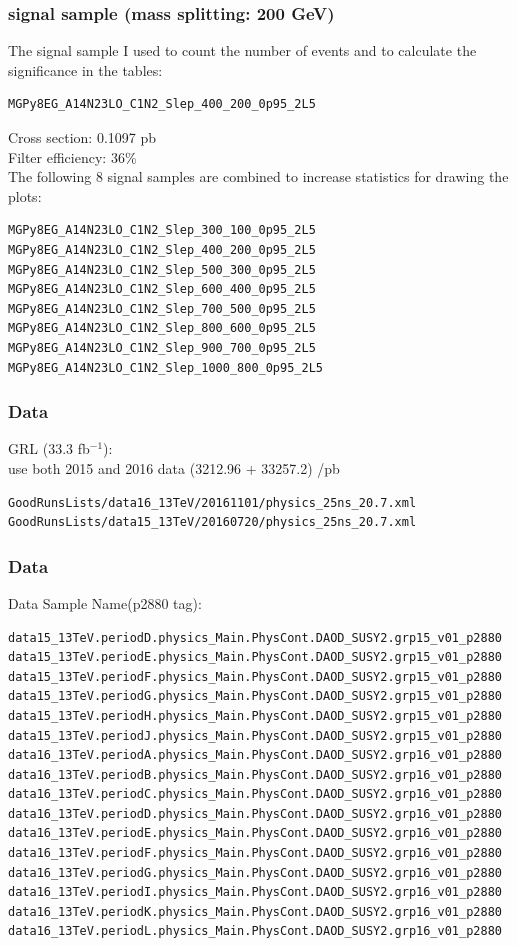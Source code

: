 \documentclass[mathserif,serif]{beamer}
\begin{document}
\begin{frame}[fragile]
\frametitle{signal sample (mass splitting: 200 GeV)}
\small
The signal sample I used to count the number of events and to calculate the significance in the tables:
\tiny
\begin{verbatim}
MGPy8EG_A14N23LO_C1N2_Slep_400_200_0p95_2L5
\end{verbatim}
\small
Cross section: 0.1097 pb \\
Filter efficiency: 36\% \\
\vspace{5mm}
The following 8 signal samples are combined to increase statistics for drawing the plots:
\tiny
\begin{verbatim}
MGPy8EG_A14N23LO_C1N2_Slep_300_100_0p95_2L5
MGPy8EG_A14N23LO_C1N2_Slep_400_200_0p95_2L5
MGPy8EG_A14N23LO_C1N2_Slep_500_300_0p95_2L5
MGPy8EG_A14N23LO_C1N2_Slep_600_400_0p95_2L5
MGPy8EG_A14N23LO_C1N2_Slep_700_500_0p95_2L5
MGPy8EG_A14N23LO_C1N2_Slep_800_600_0p95_2L5
MGPy8EG_A14N23LO_C1N2_Slep_900_700_0p95_2L5
MGPy8EG_A14N23LO_C1N2_Slep_1000_800_0p95_2L5
\end{verbatim}
\end{frame}

\begin{frame}[fragile]
\frametitle{Data}
\small
GRL (33.3 fb$^{-1}$):\\
use both 2015 and 2016 data (3212.96 + 33257.2) /pb
\tiny
\begin{verbatim}
GoodRunsLists/data16_13TeV/20161101/physics_25ns_20.7.xml
GoodRunsLists/data15_13TeV/20160720/physics_25ns_20.7.xml
\end{verbatim}
\end{frame}

\begin{frame}[fragile]
\frametitle{Data}
\small
Data Sample Name(p2880 tag):
\tiny
\begin{verbatim}
data15_13TeV.periodD.physics_Main.PhysCont.DAOD_SUSY2.grp15_v01_p2880
data15_13TeV.periodE.physics_Main.PhysCont.DAOD_SUSY2.grp15_v01_p2880
data15_13TeV.periodF.physics_Main.PhysCont.DAOD_SUSY2.grp15_v01_p2880
data15_13TeV.periodG.physics_Main.PhysCont.DAOD_SUSY2.grp15_v01_p2880
data15_13TeV.periodH.physics_Main.PhysCont.DAOD_SUSY2.grp15_v01_p2880
data15_13TeV.periodJ.physics_Main.PhysCont.DAOD_SUSY2.grp15_v01_p2880
data16_13TeV.periodA.physics_Main.PhysCont.DAOD_SUSY2.grp16_v01_p2880
data16_13TeV.periodB.physics_Main.PhysCont.DAOD_SUSY2.grp16_v01_p2880
data16_13TeV.periodC.physics_Main.PhysCont.DAOD_SUSY2.grp16_v01_p2880
data16_13TeV.periodD.physics_Main.PhysCont.DAOD_SUSY2.grp16_v01_p2880
data16_13TeV.periodE.physics_Main.PhysCont.DAOD_SUSY2.grp16_v01_p2880
data16_13TeV.periodF.physics_Main.PhysCont.DAOD_SUSY2.grp16_v01_p2880
data16_13TeV.periodG.physics_Main.PhysCont.DAOD_SUSY2.grp16_v01_p2880
data16_13TeV.periodI.physics_Main.PhysCont.DAOD_SUSY2.grp16_v01_p2880
data16_13TeV.periodK.physics_Main.PhysCont.DAOD_SUSY2.grp16_v01_p2880
data16_13TeV.periodL.physics_Main.PhysCont.DAOD_SUSY2.grp16_v01_p2880
\end{verbatim}
\end{frame}
\end{document}
